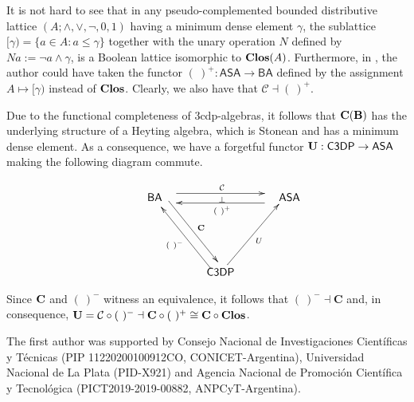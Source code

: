 \documentclass[a4paper,11pt]{article}
\theoremstyle{definition}
\newcommand{\aS}{\mathsf{ASA}}
\newcommand{\clos}{\mathrm{\bf{Clos}}}
\newcommand{\hdz}{\mathsf{C3DP}}
\newcommand{\bool}{\mathsf{BA}}
\begin{document}
It is not hard to see that in any pseudo-complemented bounded distributive lattice $(A; \wedge, \vee, \neg, 0, 1)$ having a minimum dense element $\gamma$, the sublattice $[\gamma) = \{a \in A: a \leq \gamma\}$ together with the unary operation $N$ defined by $Na := \neg a \wedge \gamma$, is a Boolean lattice isomorphic to $\clos(A)$. 
Furthermore, in \cite{IRp}, the author could have taken the functor $(\ )^{+} : \aS \to \bool$ defined by the assignment $A \mapsto [\gamma)$ instead of $\clos$. 
Clearly, we also have that $\mathcal{C} \dashv (\ )^{+}$.
 
Due to the functional completeness of 3cdp-algebras, it follows that $\bf{C}(B)$ has the underlying structure of a Heyting algebra, which is Stonean and has a minimum dense element. 
As a consequence, we have a forgetful functor $\bf{U} : \hdz \to \aS$ making the following diagram commute.

	\[
	\xymatrix{
		&\bool  \ \ \ \ar@<1ex>[rr]^{\mathcal{C}}_{\bot} \ar@<1ex>[ddr]^{\mathbf{C}} &   & \ \ \ \aS \ar@<1ex>[ll]^{(\ )^{+}}       \\
		&                                             &   &   \\
        &    &  \hdz \ar@<1ex>[uul]^{(\ )^{-}}  \ar[uur]_{U}&   \\
	}
	\] 	

\noindent Since $\bf{C}$ and $(\ )^{-}$ witness an equivalence, it follows that $(\ )^{-} \dashv \mathbf{C}$ and, in consequence, $ \bf{U} = \mathcal{C} \circ \bf{(\ )^{-}} \dashv \mathbf{\bf{C}} \circ (\ )^{+} \cong \mathbf{\bf{C}} \circ \clos$. \\
	


\noindent The first author was supported by Consejo Nacional de Investigaciones Cient\'ificas y T\'ecnicas (PIP 11220200100912CO, CONICET-Argentina), Universidad Nacional de La Plata (PID-X921) and Agencia Nacional de Promoci\'on Cient\'ifica y Tecnol\'ogica (PICT2019-2019-00882, ANPCyT-Argentina).
\end{document}
